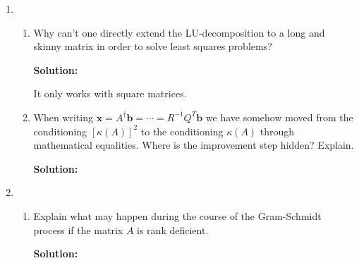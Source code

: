 \documentclass[12pt]{article}
\begin{document}
\begin{enumerate}
\begin{enumerate}
We can take the exponential of both sides, giving

\begin{align*}
u(t) &= e^{\gamma_{1} + t\gamma_{2}} = e^{\gamma_{1}}e^{\gamma_{2}}\\
\intertext{with}
A &= \begin{pmatrix}1 & 0\\1 & 1\\ 1 & 2 \end{pmatrix}\quad \mathbf{b} = \begin{pmatrix}1\\ 0.9\\ 2 \end{pmatrix}
\intertext{In finding $\mathbf{x}$ in $A\mathbf{x} = \mathbf{b}$, we get}
x &= \begin{pmatrix}0.05\\ 0.95\end{pmatrix}\\
u(t) &= e^{0.05}e^{0.95t} = a_{1}e^{ta_{2}}
\end{align*}

\end{enumerate}

\item \
\begin{enumerate}
\item Why can't one directly extend the LU-decomposition to a long and skinny
matrix in order to solve least squares problems?

{\bf Solution:}

It only works with square matrices.

\item When writing $\mathbf{x} = A^{\dagger}\mathbf{b} = \cdots = R^{-1}Q^{T}\mathbf{b}$
we have somehow moved from the conditioning $\left[\kappa(A)\right]^{2}$ to the
conditioning $\kappa(A)$ through mathematical equalities. Where is the improvement
step hidden? Explain.

{\bf Solution:}



\end{enumerate}

\item \
\begin{enumerate}
  \item Explain what may happen during the course of the Gram-Schmidt process if
  the matrix $A$ is rank deficient.

  {\bf Solution:}


\end{enumerate}
\end{enumerate}
\end{document}
